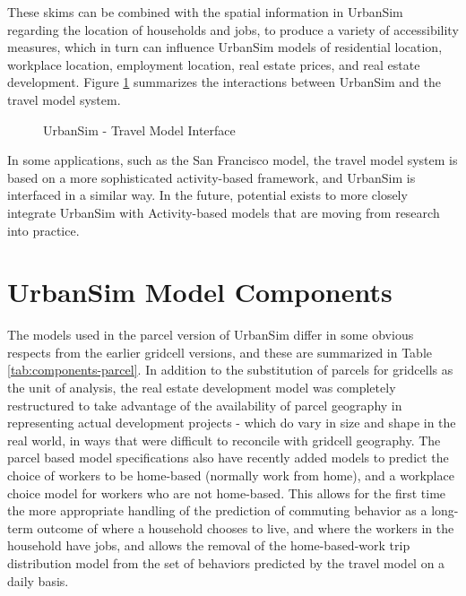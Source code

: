 These skims can be combined with the spatial information in UrbanSim regarding the location of households and jobs, to produce
a variety of accessibility measures, which in turn can influence UrbanSim models of residential location, workplace location, employment
location, real estate prices, and real estate development.  Figure \ref{fig:TMinterface} summarizes the interactions between UrbanSim and
the travel model system.

\begin{figure}[h]
\center {}
\caption{UrbanSim - Travel Model Interface} \label{fig:TMinterface}
\end{figure}

In some applications, such as the San Francisco model, the travel model system is based on a more sophisticated activity-based
framework, and UrbanSim is interfaced in a similar way. In the future, potential exists to more closely integrate UrbanSim with
Activity-based models that are moving from research into practice.

\section{UrbanSim Model Components}

The models used in the parcel version of UrbanSim differ in some obvious respects from the earlier gridcell versions, and these are summarized in Table \ref{tab:components-parcel}.  In addition to the substitution of parcels for gridcells as the unit of analysis, the real estate development model was completely restructured to take advantage of the availability of parcel geography in representing actual development projects - which do vary in size and shape in the real world, in ways that were difficult to reconcile with gridcell geography.  The parcel based model specifications also have recently added models to predict the choice of workers to be home-based (normally work from home), and a workplace choice model for workers who are not home-based.  This allows for the first time the more appropriate handling of the prediction of commuting behavior as a long-term outcome of where a household chooses to live, and where the workers in the household have jobs, and allows the removal of the home-based-work trip distribution model from the set of behaviors predicted by the travel model on a daily basis.

